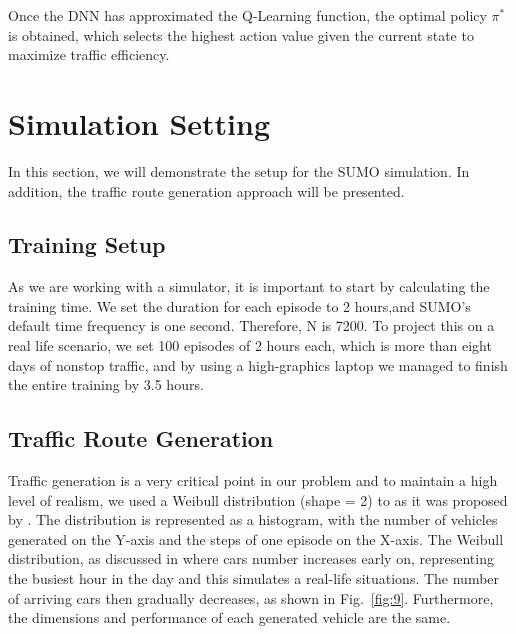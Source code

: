 \documentclass[conference]{IEEEtran}
\begin{document}
Once the DNN has approximated the Q-Learning function, the optimal policy $\pi^*$ is obtained, which selects the highest action value given the current state to maximize traffic efficiency.

\section{Simulation Setting}\label{SS}

In this section, we will demonstrate the setup for the SUMO simulation. In addition, the traffic route generation approach will be presented.

\subsection{Training Setup}
As we are working with a simulator, it is important to start by calculating the training time. We set the duration for each episode to 2 hours,and SUMO's default time frequency is one second. Therefore, N is 7200. To project this on a real life scenario, we set 100 episodes of 2 hours each, which is more than eight days of nonstop traffic, and by using a high-graphics laptop we managed to finish the entire training by 3.5 hours. 

\subsection{Traffic Route Generation}
Traffic generation is a very critical point in our problem and to maintain a high level of realism, we used a Weibull distribution (shape = 2) to as it was proposed by \cite{Deep}.
The distribution is represented as a histogram, with the number of vehicles generated on the Y-axis and the steps of one episode on the X-axis. The Weibull distribution, as discussed in \cite{Deep} where cars number increases early on, representing the busiest hour in the day and this simulates a real-life situations. The number of arriving cars then gradually decreases, as shown in Fig.~\ref{fig:9}. Furthermore, the dimensions and performance of each generated vehicle are the same.
\end{document}
